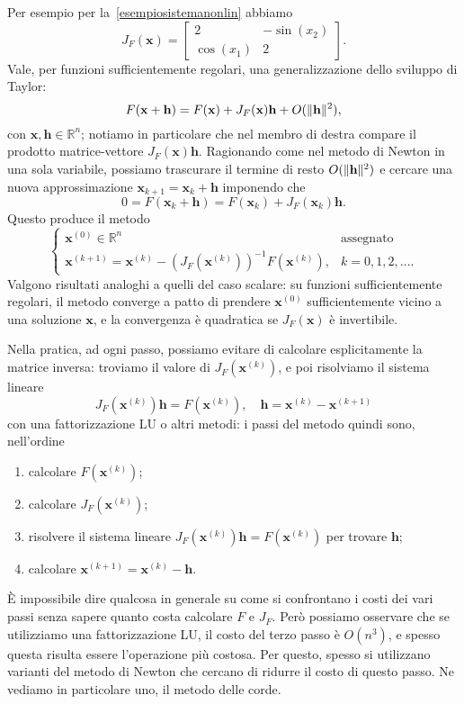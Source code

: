 \documentclass[a4paper]{report}
\DeclarePairedDelimiter{\norm}{\lVert}{\rVert}
\theoremstyle{definiton}
\theoremstyle{remark}
\newcommand{\x}{\mathbf{x}}
\begin{document}
Per esempio per la~\eqref{esempiosistemanonlin} abbiamo
\[
J_F(\x) = \begin{bmatrix}
    2 & -\sin(x_2)\\
    \cos(x_1) & 2
\end{bmatrix}.
\]
Vale, per funzioni sufficientemente regolari, una generalizzazione dello sviluppo di Taylor:
\begin{equation} \label{taylormulti}
    F(\x+\mathbf{h}) = F(\x) + J_F(\x) \mathbf{h} + O(\norm{\mathbf{h}}^2),
\end{equation}
con $\x,\mathbf{h} \in\mathbb{R}^n$; notiamo in particolare che nel membro di destra compare il prodotto matrice-vettore $J_F(\x) \mathbf{h}$. Ragionando come nel metodo di Newton in una sola variabile, possiamo trascurare il termine di resto $O(\norm{\mathbf{h}}^2)$ e cercare una nuova approssimazione $\x_{k+1} = \x_k+\mathbf{h}$ imponendo che
\[
    0 = F(\x_k+\mathbf{h}) = F(\x_k) + J_F(\x_k) \mathbf{h}.
\]
Questo produce il metodo
\[
\begin{cases}
\x^{(0)} \in \mathbb{R}^n & \text{assegnato}\\
\x^{(k+1)} = \x^{(k)} - \left(J_F(\x^{(k)})\right)^{-1} F(\x^{(k)}), & k=0,1,2,\dots.
\end{cases}
\]
Valgono risultati analoghi a quelli del caso scalare: su funzioni sufficientemente regolari, il metodo converge a patto di prendere $\x^{(0)}$ sufficientemente vicino a una soluzione $\x$, e la convergenza è quadratica se $J_F(\x)$ è invertibile. 

Nella pratica, ad ogni passo, possiamo evitare di calcolare esplicitamente la matrice inversa: troviamo il valore di $J_F(\x^{(k)})$, e poi risolviamo il sistema lineare
\[
    J_F(\x^{(k)}) \mathbf{h} = F(\x^{(k)}), \quad \mathbf{h} = \x^{(k)} - \x^{(k+1)}
\]
con una fattorizzazione LU o altri metodi: i passi del metodo quindi sono, nell'ordine
\begin{enumerate}
    \item calcolare $F(\x^{(k)})$;
    \item calcolare $J_F(\x^{(k)})$;
    \item risolvere il sistema lineare $J_F(\x^{(k)}) \mathbf{h} = F(\x^{(k)})$ per trovare $\mathbf{h}$;
    \item calcolare $\x^{(k+1)} = \x^{(k)} - \mathbf{h}$.
\end{enumerate}
È impossibile dire qualcosa in generale su come si confrontano i costi dei vari passi senza sapere quanto costa calcolare $F$ e $J_F$. Però possiamo osservare che se utilizziamo una fattorizzazione LU, il costo del terzo passo è $O(n^3)$, e spesso questa risulta essere l'operazione più costosa. Per questo, spesso si utilizzano varianti del metodo di Newton che cercano di ridurre il costo di questo passo. Ne vediamo in particolare uno, il metodo delle corde.
\end{document}
